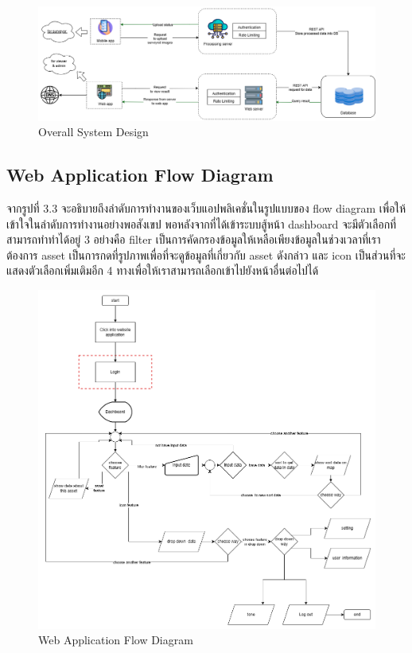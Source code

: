 \begin{figure}[ht]
  \begin{center}
  \includegraphics[scale=0.45]{resources/SystemDesign.png}
  \end{center}
  \caption[System Design]{Overall System Design}
  \label{fig:system design}
\end{figure}

\newpage
\subsection{Web Application Flow Diagram}
จากรูปที่ 3.3 จะอธิบายถึงลำดับการทำงานของเว็บแอปพลิเคชั่นในรูปแบบของ flow diagram เพื่อให้เข้าใจในลำดับการทำงานอย่างพอสังเขป 
พอหลังจากที่ได้เข้าระบบสู้หน้า dashboard จะมีตัวเลือกที่สามารถทำทำได้อยู่ 3 อย่างคือ filter เป็นการคัดกรองข้อมูลให้เหลือเพียงข้อมูลในช่วงเวลาที่เราต้องการ 
asset เป็นการกดที่รูปภาพเพื่อที่จะดูข้อมูลที่เกี่ยวกับ asset ดังกล่าว และ icon เป็นส่วนที่จะแสดงตัวเลือกเพิ่มเติมอีก 4 ทางเพื่อให้เราสามารถเลือกเข้าไปยังหน้าอื่นต่อไปได้

\begin{figure}[ht]
  \begin{center}
  \includegraphics[scale=0.65]{resources/WebsiteFlow.png}
  \end{center}
  \caption[Web Application Flow Diagram]{Web Application Flow Diagram}
  \label{fig:web-app flow design}
\end{figure}

